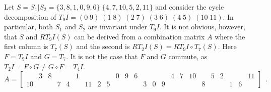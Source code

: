 \begin{example}
	\label{topSquareSideExample}
    \cite[218]{Starr1984}
    Let $S = S_1 | S_2 = \{ 3, 8, 1, 0, 9, 6 \} | \{ 4, 7, 10, 5, 2, 11 \}$ and consider the cycle decomposition of $T_9I = (0 \; 9) \; (1 \; 8) \; (2 \; 7) \; (3 \; 6) \; (4 \; 5) \; (10 \; 11)$. In particular, both $S_1$ and $S_2$ are invariant under $T_9I$. It is not obvious, however, that $S$ and $RT_9I(S)$ can be derived from a combination matrix $A$ where the first column is $T_7(S)$ and the second is $RT_2I(S) = RT_9I \circ T_7(S)$. Here $F = T_9I$ and $G = T_7$. It is not the case that $F$ and $G$ commute, as $T_2I = F \circ G \ne G \circ F = T_4I$.
    \begin{equation}
    	\label{topSquareSideEquation}
        A = \left[
        \begin{array}{cccccccccccc|cccccccccccc}
            & 3 & 8 &&& 1 &&&& 0 & 9 & 6 &&&& 4 & 7 & 10 && 5 & 2 &&& 11 \\
            10 &&& 7 & 4 && 11 & 2 & 5 &&&& 3 & 0 & 9 &&&& 8 &&& 1 & 6 &
        \end{array}
        \right] \enspace.
    \end{equation}
\end{example}

